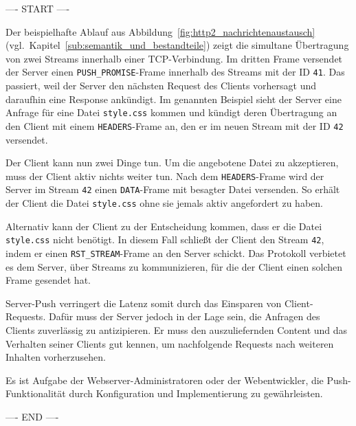 \documentclass[a4paper, justified, notoc]{tufte-handout} %
\begin{document}
---- START ----

Der beispielhafte Ablauf aus Abbildung~\ref{fig:http2_nachrichtenaustausch} (vgl.~Kapitel~\ref{sub:semantik_und_bestandteile}) zeigt die simultane Übertragung von zwei Streams innerhalb einer TCP-Verbindung. Im dritten Frame versendet der Server einen \texttt{PUSH\_PROMISE}-Frame innerhalb des Streams mit der ID \texttt{41}. Das passiert, weil der Server den nächsten Request des Clients vorhersagt und daraufhin eine Response ankündigt. Im genannten Beispiel sieht der Server eine Anfrage für eine Datei \texttt{style.css} kommen und kündigt deren Übertragung an den Client mit einem \texttt{HEADERS}-Frame an, den er im neuen Stream mit der ID \texttt{42} versendet.

Der Client kann nun zwei Dinge tun. Um die angebotene Datei zu akzeptieren, muss der Client aktiv nichts weiter tun. Nach dem \texttt{HEADERS}-Frame wird der Server im Stream \texttt{42} einen \texttt{DATA}-Frame mit besagter Datei versenden. So erhält der Client die Datei \texttt{style.css} ohne sie jemals aktiv angefordert zu haben.

Alternativ kann der Client zu der Entscheidung kommen, dass er die Datei \texttt{style.css} nicht benötigt. In diesem Fall schließt der Client den Stream \texttt{42}, indem er einen \texttt{RST\_STREAM}-Frame an den Server schickt. Das Protokoll verbietet es dem Server, über Streams zu kommunizieren, für die der Client einen solchen Frame gesendet hat.

Server-Push verringert die Latenz somit durch das Einsparen von Client-Requests. Dafür muss der Server jedoch in der Lage sein, die Anfragen des Clients zuverlässig zu antizipieren. Er muss den auszuliefernden Content und das Verhalten seiner Clients gut kennen, um nachfolgende Requests nach weiteren Inhalten vorherzusehen.

Es ist Aufgabe der Webserver-Administratoren oder der Webentwickler, die Push-Funktionalität durch Konfiguration und Implementierung zu gewährleisten.

---- END ----
\end{document}
